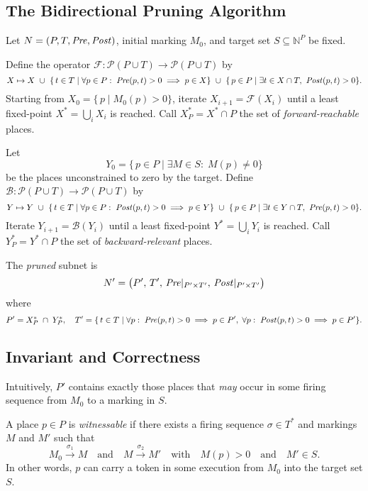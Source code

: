 \subsection{The Bidirectional Pruning Algorithm}

Let $N=(P,T,\mathit{Pre},\mathit{Post})$, initial marking $M_0$, and target set
$S\subseteq\mathbb{N}^P$ be fixed.

\begin{definition}
	Define the operator $\mathcal{F}:\mathcal{P}(P\cup T)\to\mathcal{P}(P\cup T)$ by
	\[
	X \mapsto X
	~\cup~
	\{\,t\in T \mid \forall p\in P:\; \mathit{Pre}(p,t)>0 \implies p\in X\}
	~\cup~
	\{\,p\in P \mid \exists t\in X\cap T,\ \mathit{Post}(p,t)>0\}.
	\]
	Starting from $X_0 = \{\,p\mid M_0(p)>0\}$, iterate
	$X_{i+1} = \mathcal{F}(X_i)$ until a least fixed-point
	$X^*=\bigcup_i X_i$ is reached.  Call $X^*_P = X^*\cap P$ the set of
	\emph{forward-reachable} places.
\end{definition}

\begin{definition}
	Let
	\[
	Y_0 = \{\,p\in P \mid \exists M\in S:\;M(p)\neq0\}
	\]
	be the places unconstrained to zero by the target.  Define
	$\mathcal{B}:\mathcal{P}(P\cup T)\to\mathcal{P}(P\cup T)$ by
	\[
	Y \mapsto Y
	~\cup~
	\{\,t\in T \mid \forall p\in P:\; \mathit{Post}(p,t)>0 \implies p\in Y\}
	~\cup~
	\{\,p\in P \mid \exists t\in Y\cap T,\ \mathit{Pre}(p,t)>0\}.
	\]
	Iterate $Y_{i+1} = \mathcal{B}(Y_i)$ until a least fixed-point
	$Y^*=\bigcup_i Y_i$ is reached.  Call $Y^*_P = Y^*\cap P$ the set of
	\emph{backward-relevant} places.
\end{definition}

\begin{definition}
	The \emph{pruned} subnet is
	\[
	N' = \bigl(P',\,T',\,\mathit{Pre}|_{P'\times T'},\,\mathit{Post}|_{P'\times T'}\bigr)
	\]
	where
	\[
	P' = X^*_P \;\cap\; Y^*_P,
	\quad
	T' = \{\,t\in T \mid
	\forall p:\;\mathit{Pre}(p,t)>0\implies p\in P',\;
	\forall p:\;\mathit{Post}(p,t)>0\implies p\in P'
	\}.
	\]
\end{definition}

\subsection{Invariant and Correctness}

Intuitively, $P'$ contains exactly those places that
\emph{may} occur in some firing sequence from $M_0$ to a marking in $S$.

\begin{definition}
	A place $p\in P$ is \emph{witnessable} if there exists a firing
	sequence $\sigma\in T^*$ and markings $M$ and $M'$ such that
	\[
	M_0 \xrightarrow{\sigma_1} M
	\quad\text{and}\quad
	M \xrightarrow{\sigma_2} M'
	\quad\text{with}\quad
	M(p)>0
	\quad\text{and}\quad
	M'\in S.
	\]
	In other words, $p$ can carry a token in some execution from $M_0$ into the target set $S$.
\end{definition}

